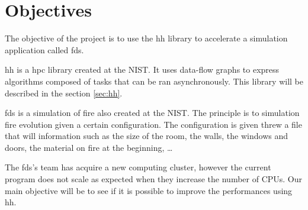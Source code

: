 
\section{Objectives}

The objective of the project is to use the \gls{hh} library to accelerate a
simulation application called \gls{fds}.

\gls{hh} is a \gls{hpc} library created at the NIST. It uses data-flow graphs to
express algorithms composed of tasks that can be ran asynchronously. This
library will be described in the section \ref{sec:hh}.

\gls{fds} is a simulation of fire also created at the NIST. The principle is to
simulation fire evolution given a certain configuration. The configuration is
given threw a file that will information such as the size of the room, the
walls, the windows and doors, the material on fire at the beginning, \dots

The \gls{fds}'s team has acquire a new computing cluster, however the current
program does not scale as expected when they increase the number of CPUs. Our
main objective will be to see if it is possible to improve the performances
using \gls{hh}.
